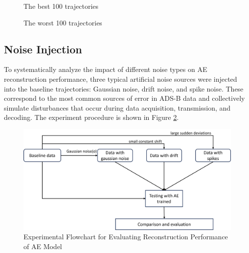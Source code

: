 \begin{figure}[htbp]
	\centering
	\begin{floatrow}
		{%
			\captionsetup{width=\linewidth} %
			\caption{The best 100 trajectories}
			\label{fig:best100}
		}
		\hfill %
		
		{%
			\captionsetup{width=\linewidth} %
			\caption{The worst 100 trajectories}
			\label{fig:worst100}
		}
	\end{floatrow}
\end{figure}

\subsection{Noise Injection}
To systematically analyze the impact of different noise types on AE reconstruction performance, three typical artificial noise sources were injected into the baseline trajectories: Gaussian noise, drift noise, and spike noise. These correspond to the most common sources of error in ADS-B data and collectively simulate disturbances that occur during data acquisition, transmission, and decoding. The experiment procedure is shown in Figure \ref{fig:experiment-structure}.
\begin{figure}[h]
	\centering
	\includegraphics[width=0.6\linewidth]{"experiment structure"}
	\caption{Experimental Flowchart for Evaluating Reconstruction Performance of AE Model}
	\label{fig:experiment-structure}
\end{figure}


